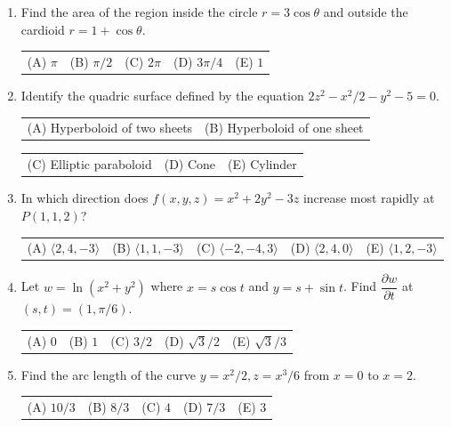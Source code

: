 \documentclass[a4paper, 12pt]{article}
\begin{document}
\begin{enumerate}[leftmargin=*,label=\textbf{\arabic*.}]
\item Find the area of the region inside the circle $r=3\cos\theta$ and outside the cardioid $r=1+\cos\theta$.
\begin{center}
\begin{tabular}{lllll}
(A) $\pi$ &
(B) $\pi/2$ &
(C) $2\pi$ &
(D) $3\pi/4$ &
(E) $1$
\end{tabular}
\end{center}

\item Identify the quadric surface defined by the equation $2z^2 - x^2/2 - y^2 - 5 = 0$.
\begin{center}
\begin{tabular}{ll}
(A) Hyperboloid of two sheets &
(B) Hyperboloid of one sheet 
\end{tabular}

\begin{tabular}{lll}
(C) Elliptic paraboloid &
(D) Cone &
(E) Cylinder
\end{tabular}
\end{center}

\item In which direction does $f(x,y,z) = x^2 + 2y^2 - 3z$ increase most rapidly at $P(1,1,2)$?
\begin{center}
\begin{tabular}{lllll}
(A) $\langle 2, 4, -3 \rangle$ &
(B) $\langle 1, 1, -3 \rangle$ &
(C) $\langle -2, -4, 3 \rangle$ &
(D) $\langle 2, 4, 0 \rangle$ &
(E) $\langle 1, 2, -3 \rangle$
\end{tabular}
\end{center}

\item Let $w = \ln(x^2 + y^2)$ where $x = s\cos t$ and $y = s + \sin t$. Find $\dfrac{\partial w}{\partial t}$ at $(s,t) = (1, \pi/6)$.
\begin{center}
\begin{tabular}{lllll}
(A) $0$ &
(B) $1$ &
(C) $3/2$ &
(D) $\sqrt{3}/2$ &
(E) $\sqrt{3}/3$ 
\end{tabular}
\end{center}

\item Find the arc length of the curve $y = x^2/2, z = x^3/6$ from $x = 0$ to $x = 2$.
\begin{center}
\begin{tabular}{lllll}
(A) $10/3$ &
(B) $8/3$ &
(C) $4$ &
(D) $7/3$ &
(E) $3$
\end{tabular}
\end{center}


\end{enumerate}
\end{document}
